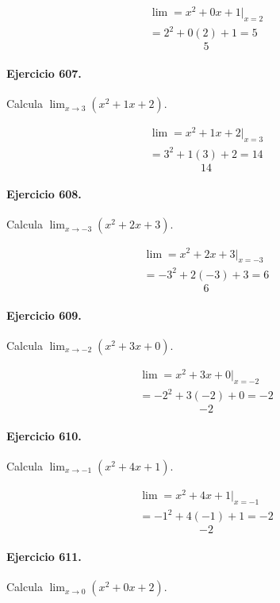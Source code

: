 \documentclass[11pt,a4paper]{article}
\begin{document}
\[
\begin{aligned}
\lim=x^2+0x+1\big|_{x=2}\\
=2^2+0(2)+1=5
\end{aligned}
\]
\[\boxed{5}\]


\paragraph{Ejercicio 607.} Calcula $\displaystyle\lim_{x\to 3}(x^2+1x+2)$.

\[
\begin{aligned}
\lim=x^2+1x+2\big|_{x=3}\\
=3^2+1(3)+2=14
\end{aligned}
\]
\[\boxed{14}\]


\paragraph{Ejercicio 608.} Calcula $\displaystyle\lim_{x\to -3}(x^2+2x+3)$.

\[
\begin{aligned}
\lim=x^2+2x+3\big|_{x=-3}\\
=-3^2+2(-3)+3=6
\end{aligned}
\]
\[\boxed{6}\]


\paragraph{Ejercicio 609.} Calcula $\displaystyle\lim_{x\to -2}(x^2+3x+0)$.

\[
\begin{aligned}
\lim=x^2+3x+0\big|_{x=-2}\\
=-2^2+3(-2)+0=-2
\end{aligned}
\]
\[\boxed{-2}\]


\paragraph{Ejercicio 610.} Calcula $\displaystyle\lim_{x\to -1}(x^2+4x+1)$.

\[
\begin{aligned}
\lim=x^2+4x+1\big|_{x=-1}\\
=-1^2+4(-1)+1=-2
\end{aligned}
\]
\[\boxed{-2}\]


\paragraph{Ejercicio 611.} Calcula $\displaystyle\lim_{x\to 0}(x^2+0x+2)$.
\end{document}
